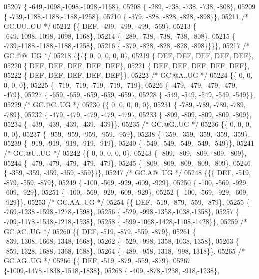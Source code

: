 \begin{DoxyCode}
05207 \{ -649,-1098,-1098,-1098,-1168\},
05208 \{ -289, -738, -738, -738, -808\},
05209 \{ -739,-1188,-1188,-1188,-1258\},
05210 \{ -379, -828, -828, -828, -898\}\},
05211 \textcolor{comment}{/* GC.UU..GU */}
05212 \{\{  DEF, -499, -499, -499, -569\},
05213 \{ -649,-1098,-1098,-1098,-1168\},
05214 \{ -289, -738, -738, -738, -808\},
05215 \{ -739,-1188,-1188,-1188,-1258\},
05216 \{ -379, -828, -828, -828, -898\}\}\}\},
05217 \textcolor{comment}{/* GC.@@..UG */}
05218 \{\{\{\{    0,    0,    0,    0,    0\},
05219 \{  DEF,  DEF,  DEF,  DEF,  DEF\},
05220 \{  DEF,  DEF,  DEF,  DEF,  DEF\},
05221 \{  DEF,  DEF,  DEF,  DEF,  DEF\},
05222 \{  DEF,  DEF,  DEF,  DEF,  DEF\}\},
05223 \textcolor{comment}{/* GC.@A..UG */}
05224 \{\{    0,    0,    0,    0,    0\},
05225 \{ -719, -719, -719, -719, -719\},
05226 \{ -479, -479, -479, -479, -479\},
05227 \{ -659, -659, -659, -659, -659\},
05228 \{ -549, -549, -549, -549, -549\}\},
05229 \textcolor{comment}{/* GC.@C..UG */}
05230 \{\{    0,    0,    0,    0,    0\},
05231 \{ -789, -789, -789, -789, -789\},
05232 \{ -479, -479, -479, -479, -479\},
05233 \{ -809, -809, -809, -809, -809\},
05234 \{ -439, -439, -439, -439, -439\}\},
05235 \textcolor{comment}{/* GC.@G..UG */}
05236 \{\{    0,    0,    0,    0,    0\},
05237 \{ -959, -959, -959, -959, -959\},
05238 \{ -359, -359, -359, -359, -359\},
05239 \{ -919, -919, -919, -919, -919\},
05240 \{ -549, -549, -549, -549, -549\}\},
05241 \textcolor{comment}{/* GC.@U..UG */}
05242 \{\{    0,    0,    0,    0,    0\},
05243 \{ -809, -809, -809, -809, -809\},
05244 \{ -479, -479, -479, -479, -479\},
05245 \{ -809, -809, -809, -809, -809\},
05246 \{ -359, -359, -359, -359, -359\}\}\},
05247 \textcolor{comment}{/* GC.A@..UG */}
05248 \{\{\{  DEF, -519, -879, -559, -879\},
05249 \{ -100, -569, -929, -609, -929\},
05250 \{ -100, -569, -929, -609, -929\},
05251 \{ -100, -569, -929, -609, -929\},
05252 \{ -100, -569, -929, -609, -929\}\},
05253 \textcolor{comment}{/* GC.AA..UG */}
05254 \{\{  DEF, -519, -879, -559, -879\},
05255 \{ -769,-1238,-1598,-1278,-1598\},
05256 \{ -529, -998,-1358,-1038,-1358\},
05257 \{ -709,-1178,-1538,-1218,-1538\},
05258 \{ -599,-1068,-1428,-1108,-1428\}\},
05259 \textcolor{comment}{/* GC.AC..UG */}
05260 \{\{  DEF, -519, -879, -559, -879\},
05261 \{ -839,-1308,-1668,-1348,-1668\},
05262 \{ -529, -998,-1358,-1038,-1358\},
05263 \{ -859,-1328,-1688,-1368,-1688\},
05264 \{ -489, -958,-1318, -998,-1318\}\},
05265 \textcolor{comment}{/* GC.AG..UG */}
05266 \{\{  DEF, -519, -879, -559, -879\},
05267 \{-1009,-1478,-1838,-1518,-1838\},
05268 \{ -409, -878,-1238, -918,-1238\},

\end{DoxyCode}
